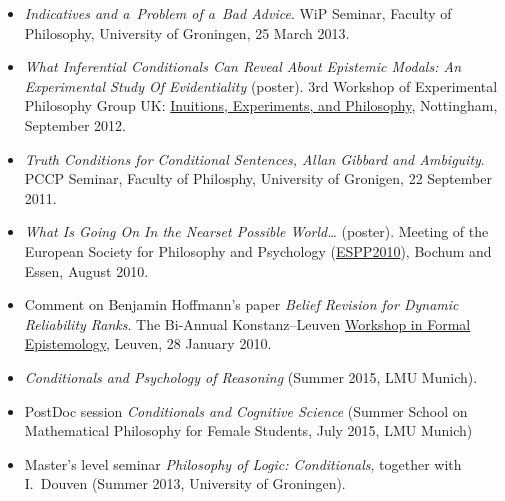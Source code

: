 \documentclass[a4paper,12pt]{article}
\begin{document}
\begin{small}
\begin{itemize}
  \item \emph{Indicatives and a~Problem of a~Bad Advice}. WiP
    Seminar, Faculty of Philosophy, University of Groningen, 25 March
    2013.
    
  \item \emph{What Inferential Conditionals Can Reveal About Epistemic
      Modals: An Experimental Study Of Evidentiality} (poster).
    3rd Workshop of Experimental Philosophy Group UK:
    \href{https://www.nottingham.ac.uk/philosophy/research/conferences/workshop-intuitions-experimentsandphilosophy.aspx}{Inuitions,
      Experiments, and Philosophy}, Nottingham, September 2012.

  \item \emph{Truth Conditions for Conditional Sentences, Allan
      Gibbard and Ambiguity}. PCCP Seminar, Faculty of
    Philosphy, University of Gronigen, 22 September 2011.
    
  \item \emph{What Is Going On In the Nearset Possible World\ldots} (poster). 
  Meeting of the European Society for Philosophy and  Psychology
    (\href{http://www.ruhr-uni-bochum.de/philosophy/espp2010/index.html}{ESPP2010}),
    Bochum and Essen, August 2010.

  \item Comment on Benjamin Hoffmann's paper \emph{Belief Revision for
      Dynamic Reliability Ranks}. The Bi-Annual Konstanz--Leuven
    \href{http://formalphilosophy.org/node/580}{Workshop in Formal
      Epistemology}, Leuven, 28 January 2010.
  \end{itemize}

  



  
  
  \begin{itemize}
  \item \emph{Conditionals and Psychology of Reasoning} (Summer 2015, LMU Munich).
  \item PostDoc session \emph{Conditionals and Cognitive Science} (Summer School on Mathematical Philosophy for Female Students, July 2015, LMU Munich)
  \item Master's level seminar \emph{Philosophy of Logic:
      Conditionals}, together with I.~Douven (Summer 2013, University of Groningen).
  \end{itemize}


\end{small}
\end{document}

